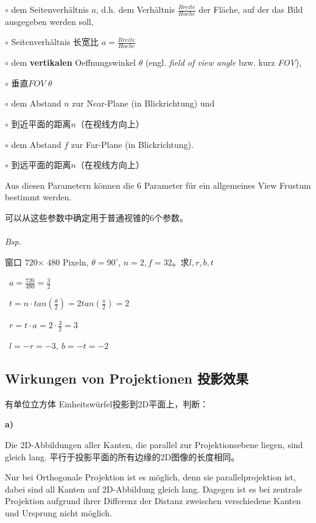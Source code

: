 \documentclass[fleqn]{article}
\begin{document}
\indent\indent $\circ$ dem Seitenverhältnis $a$, d.h. dem Verhältnis $\frac{Breite}{Hoehe}$ der Fläche, auf der das Bild ausgegeben werden soll,

\indent\indent $\circ$ Seitenverhältnis 长宽比 $a=\frac{Breite}{Hoehe}$

\indent\indent $\circ$ dem \textbf{vertikalen} Oeffnungswinkel $\theta$ (engl. \textit{field of view angle} bzw. kurz \textit{FOV}),

\indent\indent $\circ$ 垂直$FOV$ $\theta$

\indent\indent $\circ$ dem Abstand $n$ zur Near-Plane (in Blickrichtung) und

\indent\indent $\circ$ 到近平面的距离$ n $（在视线方向上）

\indent\indent $\circ$ dem Abstand $f$ zur Far-Plane (in Blickrichtung).

\indent\indent $\circ$ 到远平面的距离$ n $（在视线方向上）

Aus diesen Parametern können die 6 Parameter für ein allgemeines View Frustum bestimmt werden.

可以从这些参数中确定用于普通视锥的6个参数。
\\
\\
\textit{Bsp.}

窗口 720$\times$ 480 Pixeln, $\theta=90^\circ$, $n=2, f=32$。求$l,r,b,t$

\quad \  $a = \frac{720}{480} = \frac{3}{2}$

\quad \  $t = n \cdot tan(\frac{\theta}{2}) = 2tan(\frac{\pi}{2}) = 2$

\quad \  $r = t \cdot a = 2 \cdot \frac{3}{2} = 3$

\quad \  $l = -r = -3, \ b = -t = -2$

\subsection{Wirkungen von Projektionen 投影效果}

有单位立方体 Einheitswürfel投影到2D平面上，判断：

\noindent\textbf{a)} 

Die 2D-Abbildungen aller Kanten, die parallel zur Projektionsebene liegen, sind gleich lang.
平行于投影平面的所有边缘的2D图像的长度相同。

Nur bei Orthogonale Projektion ist es möglich, denn sie parallelprojektion ist, dabei sind all Kanten auf 2D-Abbildung gleich lang.
Dagegen ist es bei zentrale Projektion aufgrund ihrer Differenz der Distanz zweischen verschiedene Kanten und Ursprung nicht möglich.
\end{document}
